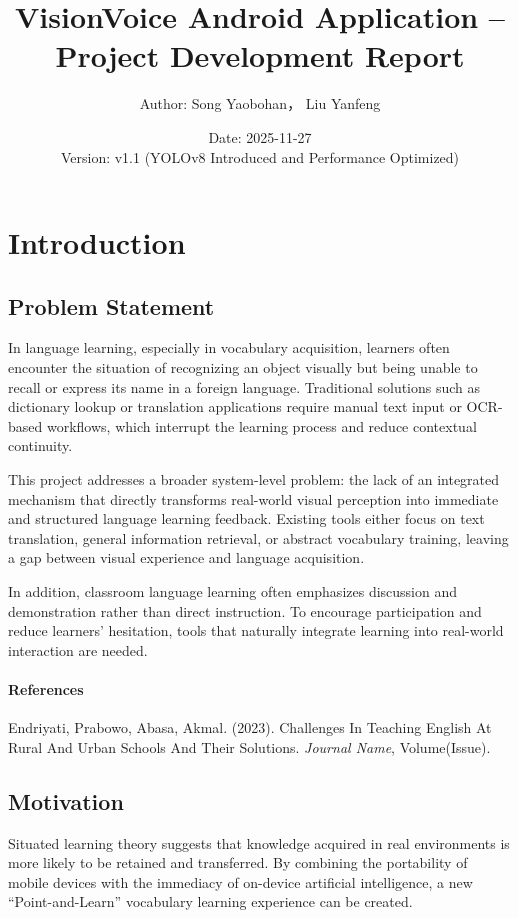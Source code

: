 \documentclass[a4paper, 12pt]{article}
\title{\textbf{VisionVoice Android Application – Project Development Report}}
\author{Author: Song Yaobohan， Liu Yanfeng}
\date{Date: 2025-11-27 \\ Version: v1.1 (YOLOv8 Introduced and Performance Optimized)}
\begin{document}
    \maketitle

    \section{Introduction}

    \subsection{Problem Statement}
    In language learning, especially in vocabulary acquisition, learners often encounter the situation of recognizing an object visually but being unable to recall or express its name in a foreign language. Traditional solutions such as dictionary lookup or translation applications require manual text input or OCR-based workflows, which interrupt the learning process and reduce contextual continuity.

    This project addresses a broader system-level problem: the lack of an integrated mechanism that directly transforms real-world visual perception into immediate and structured language learning feedback. Existing tools either focus on text translation, general information retrieval, or abstract vocabulary training, leaving a gap between visual experience and language acquisition.

    In addition, classroom language learning often emphasizes discussion and demonstration rather than direct instruction. To encourage participation and reduce learners’ hesitation, tools that naturally integrate learning into real-world interaction are needed.

    \paragraph{References}
    Endriyati, Prabowo, Abasa, Akmal. (2023). Challenges In Teaching English At Rural And Urban Schools And Their Solutions. \textit{Journal Name}, Volume(Issue).

    \subsection{Motivation}
    Situated learning theory suggests that knowledge acquired in real environments is more likely to be retained and transferred. By combining the portability of mobile devices with the immediacy of on-device artificial intelligence, a new “Point-and-Learn” vocabulary learning experience can be created.
\end{document}
